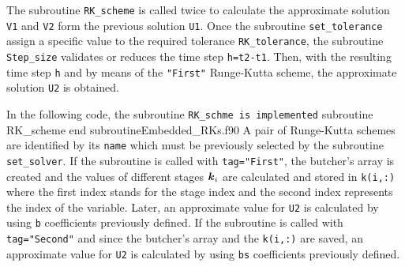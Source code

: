 The subroutine \verb|RK_scheme| is called twice to calculate the approximate solution \verb|V1| and \verb|V2| form the previous solution \verb|U1|.  Once the subroutine \verb|set_tolerance|  assign a specific value to the required tolerance \verb|RK_tolerance|,
the subroutine \verb|Step_size| validates or reduces the time step \verb|h=t2-t1|. 
Then, with the resulting time step \verb|h| and by means of the \verb|"First"| Runge-Kutta scheme, the approximate solution \verb|U2| is obtained.     
    
    
    
    
\newpage 
In the following code, the subroutine \verb|RK_schme is implemented|
      \vspace{0.5cm} 
      {subroutine RK_scheme}
      {end subroutine}{Embedded_RKs.f90}
 A pair of Runge-Kutta  schemes are identified by its \verb|name| which must be previously selected by the subroutine \verb|set_solver|. If the subroutine is called with \verb|tag="First"|, the butcher's array is created and the values of different stages $\boldsymbol{k}_i$ are calculated and stored in \verb|k(i,:)| where the first index stands for the stage index and the second index represents the index of the variable. Later, an approximate value for \verb|U2| is calculated by using \verb|b| coefficients previously defined.
 If the subroutine is called with \verb|tag="Second"| and since the butcher's array and the \verb|k(i,:)| are saved,  an approximate value for \verb|U2| is calculated by using \verb|bs| coefficients previously defined.
 
 
 
 
 
 
 
 
 
 
 
 
 
 
 
 
 
     
     
     
     
 \newpage    

